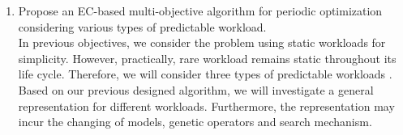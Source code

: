 \begin{enumerate}
	\item Propose an EC-based multi-objective algorithm for periodic optimization considering various types of predictable workload. \\
	 In previous objectives, we consider the problem using static workloads for simplicity. However, practically, rare workload remains static throughout its life cycle. Therefore, we will consider three types of predictable workloads \cite{Fehling:2014tl}. Based on our previous designed algorithm, we will investigate a general representation for different workloads. Furthermore, the representation may incur the changing of models, genetic operators and search mechanism.





	

	

	\end{enumerate}

